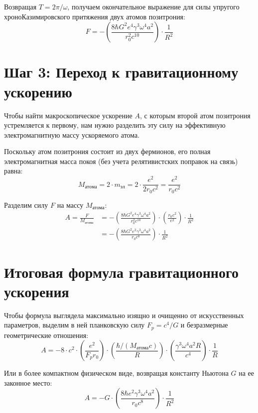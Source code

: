 \documentclass[12pt,a4paper]{article}
\begin{document}
Возвращая $T = 2\pi/\omega$, получаем окончательное выражение для силы упругого хроноКазимировского притяжения двух атомов позитрония:
\begin{equation}
F = - \left( \frac{8 \hbar G^2 e^4 \gamma^3 \omega^4 a^2}{r_0^2 c^{10}} \right) \cdot \frac{1}{R^2}
\end{equation}

\section*{Шаг 3: Переход к гравитационному ускорению}

Чтобы найти макроскопическое ускорение $A$, с которым второй атом позитрония устремляется к первому, нам нужно разделить эту силу на эффективную электромагнитную массу ускоряемого атома.

Поскольку атом позитрония состоит из двух фермионов, его полная электромагнитная масса покоя (без учета релятивистских поправок на связь) равна:
\begin{equation}
M_{атома} = 2 \cdot m_{эл} = 2 \cdot \frac{e^2}{2r_0 c^2} = \frac{e^2}{r_0 c^2}
\end{equation}

Разделим силу $F$ на массу $M_{атома}$:
\begin{align}
A = \frac{F}{M_{атома}} &= - \left( \frac{8 \hbar G^2 e^4 \gamma^3 \omega^4 a^2}{r_0^2 c^{10}} \right) \cdot \left( \frac{r_0 c^2}{e^2} \right) \cdot \frac{1}{R^2} \\
&= - \left( \frac{8 \hbar G^2 e^2 \gamma^3 \omega^4 a^2}{r_0 c^8} \right) \cdot \frac{1}{R^2}
\end{align}

\section*{Итоговая формула гравитационного ускорения}

Чтобы формула выглядела максимально изящно и очищенно от искусственных параметров, выделим в ней планковскую силу $F_p = c^4/G$ и безразмерные геометрические отношения:
\begin{equation}
A = - 8 \cdot c^2 \cdot \left( \frac{e^2}{F_p r_0} \right) \cdot \left( \frac{\hbar / (M_{атома} c)}{R} \right) \cdot \left( \frac{\gamma^3 \omega^4 a^2 R}{c^4} \right) \cdot \frac{1}{R}
\end{equation}

Или в более компактном физическом виде, возвращая константу Ньютона $G$ на ее законное место:
\begin{equation}
A = - G \cdot \left( \frac{8 \hbar e^2 \gamma^3 \omega^4 a^2}{r_0 c^8} \right) \cdot \frac{1}{R^2}
\end{equation}
\end{document}
